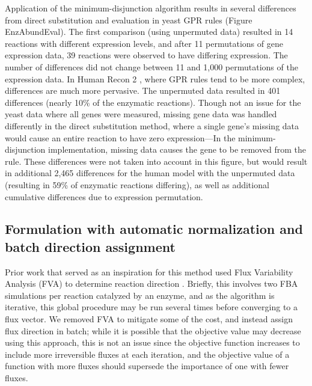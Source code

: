 Application of the minimum-disjunction algorithm results in several
differences from direct substitution and evaluation in yeast GPR rules
(Figure EnzAbundEval). The first comparison (using unpermuted data)
resulted in 14 reactions with different expression levels, and after
11 permutations of gene expression data, 39 reactions were observed to have differing
expression. The number of differences did not change between 11 and
1,000 permutations of the expression data. In Human Recon 2 \citep{Thiele2013}, where GPR
rules tend to be more complex, differences are much more
pervasive. The unpermuted data resulted in 401 differences (nearly
10\% of the enzymatic reactions). Though not an issue for the yeast
data where all genes were measured, missing gene data was handled
differently in the direct substitution method, where a single gene's
missing data would cause an entire reaction to have zero
expression---In the minimum-disjunction implementation, missing data
causes the gene to be removed from the rule. These differences were
not taken into account in this figure, but would result in additional
2,465 differences for the human model with the unpermuted data
(resulting in 59\% of enzymatic reactions differing), as well as
additional cumulative differences due to expression permutation.

%
%


\subsection{Formulation with automatic normalization and batch direction assignment}

Prior work that served as an inspiration for this method used Flux
Variability Analysis (FVA) to determine reaction direction
\citep{Lee2012}. Briefly, this involves two FBA simulations per
reaction catalyzed by an enzyme, and as the algorithm is iterative,
this global procedure may be run several times before converging to a
flux vector. We removed FVA to mitigate some
of the cost, and instead assign flux direction in batch; while it is
possible that the objective value may decrease using this approach,
this is not an issue since the objective function increases to include
more irreversible fluxes at each iteration, and the objective value of
a function with more fluxes should supersede the importance of one
with fewer fluxes.
 
